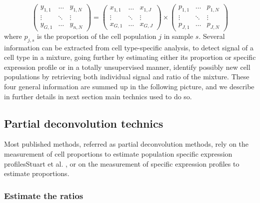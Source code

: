\[
\begin{pmatrix}
y_{1, 1} & \ldots & y_{1, N}\\
\vdots & \ddots & \vdots \\
y_{G,1} & \ldots & y_{n, N}
\end{pmatrix}
=
\begin{pmatrix}
x_{1, 1} & \ldots & x_{1, J}\\
\vdots & \ddots & \vdots \\
x_{G,1} & \ldots & x_{G, J}
\end{pmatrix}
\times
\begin{pmatrix}
p_{1, 1} & \ldots & p_{1, N}\\
\vdots & \ddots & \vdots \\
p_{J,1} & \ldots & p_{J, N}
\end{pmatrix}
\] where \(p_{j, s}\) is the proportion of the cell population \(j\) in
sample \(s\). Several information can be extracted from cell
type-specific analysis, to detect signal of a cell type in a mixture,
going further by estimating either its proportion or specific expression
profile or in a totally unsupervised manner, identify possibly new cell
populations by retrieving both individual signal and ratio of the
mixture. These four general information are summed up in the following
picture, and we describe in further details in next section main
technics used to do so.



\subsection{Partial deconvolution technics}
\label{partial-deconvolution-technics}

Most published methods, referred as partial deconvolution methods, rely
on the measurement of cell proportions to estimate population specific
expression profilesStuart et al.
\autocite{stuart_etal04}, or on the measurement of
specific expression profiles to estimate proportions.


\subsubsection{Estimate the ratios}
\label{estimate-the-ratios}

